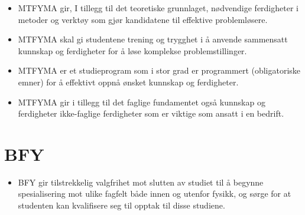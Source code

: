 \begin{itemize}
	\item MTFYMA gir, I tillegg til det teoretiske grunnlaget, nødvendige ferdigheter i metoder og verktøy som gjør kandidatene til effektive problemløsere.
	\item MTFYMA skal gi studentene trening og trygghet i å anvende sammensatt kunnskap og ferdigheter for å løse komplekse problemstillinger.
	\item MTFYMA er et studieprogram som i stor grad er programmert (obligatoriske emner) for å effektivt oppnå ønsket kunnskap og ferdigheter.
	\item MTFYMA gir i tillegg til det faglige fundamentet også kunnskap og ferdigheter ikke-faglige ferdigheter som er viktige som ansatt i en bedrift.
\end{itemize}

\section{BFY}
\begin{itemize}
	\item BFY gir tilstrekkelig valgfrihet mot slutten av studiet til å begynne spesialisering mot ulike fagfelt både innen og utenfor fysikk, og sørge for at studenten kan kvalifisere seg til opptak til disse studiene.
\end{itemize}

